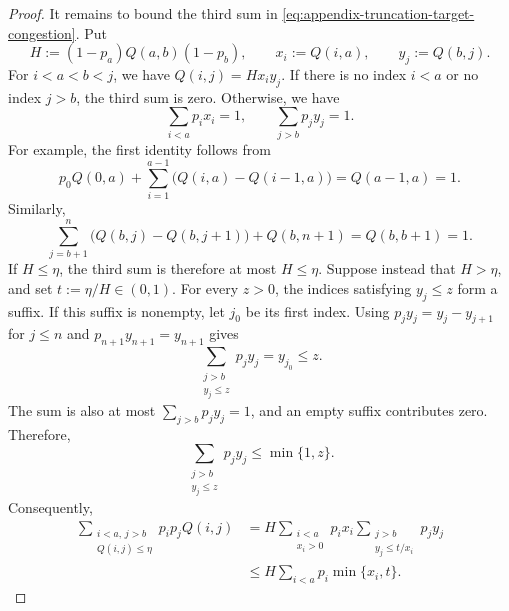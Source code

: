 \documentclass[12pt,a4paper,oneside]{report}
\begin{document}
\begin{proof}
It remains to bound the third sum in
\cref{eq:appendix-truncation-target-congestion}.  Put
\[
    H:=(1-p_a)Q(a,b)(1-p_b),
    \qquad
    x_i:=Q(i,a),
    \qquad
    y_j:=Q(b,j).
\]
For $i<a<b<j$, we have $Q(i,j)=Hx_iy_j$.  If there is no index $i<a$ or
no index $j>b$, the third sum is zero.  Otherwise, we have
\[
    \sum_{i<a}p_ix_i=1,
    \qquad
    \sum_{j>b}p_jy_j=1.
\]
For example, the first identity follows from
\[
    p_0Q(0,a)+\sum_{i=1}^{a-1}
       \bigl(Q(i,a)-Q(i-1,a)\bigr)
    =Q(a-1,a)=1.
\]
Similarly,
\[
    \sum_{j=b+1}^{n}
       \bigl(Q(b,j)-Q(b,j+1)\bigr)+Q(b,n+1)
    =Q(b,b+1)=1.
\]
If $H\le\eta$, the third sum is therefore at most $H\le\eta$.  Suppose
instead that $H>\eta$, and set $t:=\eta/H\in(0,1)$.  For every $z>0$,
the indices satisfying $y_j\le z$ form a suffix.  If this suffix is nonempty,
let $j_0$ be its first index.  Using $p_jy_j=y_j-y_{j+1}$ for $j\le n$
and $p_{n+1}y_{n+1}=y_{n+1}$ gives
\[
    \sum_{\substack{j>b\\y_j\le z}}p_jy_j
    =y_{j_0}
    \le z.
\]
The sum is also at most $\sum_{j>b}p_jy_j=1$, and an empty suffix contributes
zero.  Therefore,
\[
    \sum_{\substack{j>b\\y_j\le z}}p_jy_j\le\min\{1,z\}.
\]
Consequently,
\begin{align*}
    \sum_{\substack{i<a,\,j>b\\Q(i,j)\le\eta}}p_ip_jQ(i,j)
    &=H\sum_{\substack{i<a\\x_i>0}}p_ix_i
        \sum_{\substack{j>b\\y_j\le t/x_i}}p_jy_j\\
    &\le H\sum_{i<a}p_i\min\{x_i,t\}.
\end{align*}


\end{proof}
\end{document}
